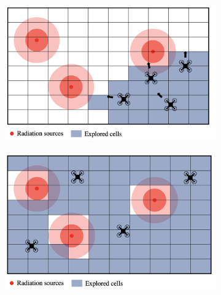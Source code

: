 \documentclass[letterpaper, 10 pt, conference]{ieeeconf}
\begin{document}
\begin{figure}[h]
    \centering
    \begin{subfigure}{0.30\textwidth}
         \centering
         \includegraphics[width=\textwidth]{images/risk_aware_b.png}
         \caption{}
         \label{risk_aware_b}
    \end{subfigure}
    \hfill
    \begin{subfigure}{0.30\textwidth}
         \centering
         \includegraphics[width=\textwidth]{images/risk_aware_c.png}
         \caption{}
         \label{risk_aware_c}
    \end{subfigure}
    \hfill
    \begin{subfigure}{0.30\textwidth}

\end{subfigure}
\end{figure}
\end{document}
